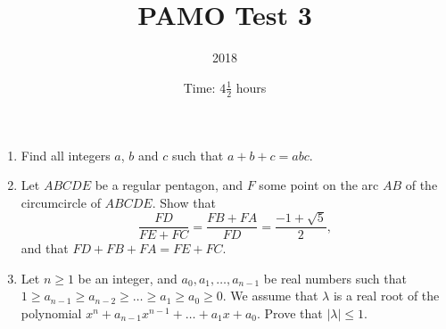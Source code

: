 \documentclass{article}
\title{PAMO Test 3}
\author{2018}
\date{Time: $4\frac{1}{2}$ hours}
\begin{document}
\maketitle

\begin{enumerate}

\item %
Find all integers $a$, $b$ and $c$ such that $a + b + c = abc$.

\item %
Let $ABCDE$ be a regular pentagon, and $F$ some point on the arc $AB$ of the
circumcircle of $ABCDE$. Show that
\[
  \frac{FD}{FE + FC} = \frac{FB + FA}{FD} = \frac{-1 + \sqrt{5}}{2},
\]
and that $FD + FB + FA = FE + FC$.

\item %
Let $n \geq 1$ be an integer, and $a_0, a_1, \dots, a_{n-1}$ be real numbers
such that $1 \geq a_{n-1} \geq a_{n-2} \geq \dots \geq a_1 \geq a_0 \geq 0$. We
assume that $\lambda$ is a real root of the polynomial $x^n + a_{n-1} x^{n-1} +
\dots + a_1 x + a_0$. Prove that $|\lambda| \leq 1$.

\end{enumerate}
\end{document}
